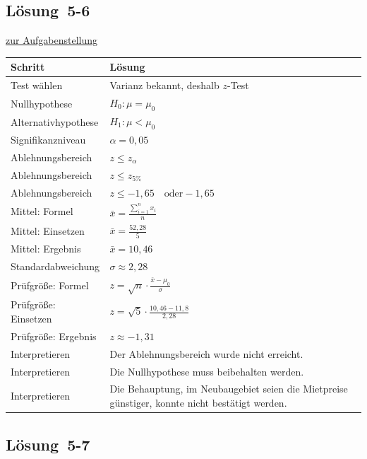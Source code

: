 \documentclass[
  11pt,
  ngerman,
  a4paper,
]{report}
\begin{document}
\hypertarget{loesung-5-6}{%
\subsection{Lösung~5-6}\label{loesung-5-6}}

\protect\hyperlink{aufgabe-5-6}{zur Aufgabenstellung}

\begin{table}[H]
\centering
\begin{tabular}{ll}
\toprule
\textbf{Schritt} & \textbf{Lösung}\\
\midrule
Test wählen & Varianz bekannt, deshalb $z$-Test\\
Nullhypothese & $H_0: \mu = \mu_0$\\
Alternativhypothese & $H_1: \mu < \mu_0$\\
Signifikanzniveau & $\alpha=0{,}05$\\
Ablehnungsbereich & $z \leq z_{\alpha}$\\
Ablehnungsbereich & $z \leq z_{5\%}$\\
Ablehnungsbereich & $z \leq -1,65\quad\textrm{oder} -1,65$\\
Mittel: Formel & $\bar{x}=\frac{\sum\limits_{i=1}^{n}x_{i}}{n}$\\
Mittel: Einsetzen & $\bar{x}=\frac{52{,}28}{5}$\\
Mittel: Ergebnis & $\bar{x}=10{,}46$\\
Standardabweichung & $\sigma\approx2{,}28$\\
Prüfgröße: Formel & $z=\sqrt{n}\cdot\frac{\bar{x}-\mu_0}{\sigma}$\\
Prüfgröße: Einsetzen & $z=\sqrt{5}\cdot\frac{10{,}46-11{,}8}{2{,}28}$\\
Prüfgröße: Ergebnis & $z\approx-1{,}31$\\
Interpretieren & Der Ablehnungsbereich wurde nicht erreicht.\\
Interpretieren & Die Nullhypothese muss beibehalten werden.\\
Interpretieren & Die Behauptung, im Neubaugebiet seien die Mietpreise günstiger, konnte nicht bestätigt werden.\\
\bottomrule
\end{tabular}
\end{table}

\hypertarget{loesung-5-7}{%
\subsection{Lösung~5-7}\label{loesung-5-7}}
\end{document}
